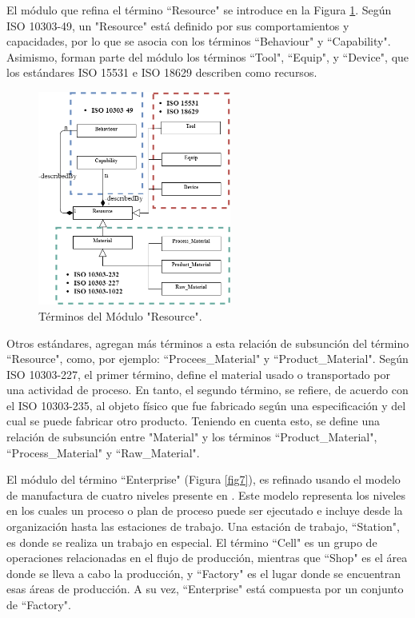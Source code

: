 \documentclass[journal]{IEEEtran}
\begin{document}
El m\'odulo que refina el t\'ermino ``Resource" se introduce en la Figura \ref{fig6}. Seg\'un ISO 10303-49, un "Resource" est\'a definido por sus comportamientos y capacidades, por lo que se asocia con los t\'erminos ``Behaviour" y ``Capability". Asimismo, forman parte del m\'odulo los t\'erminos ``Tool", ``Equip", y ``Device", que los est\'andares ISO 15531 e ISO 18629 describen como recursos. 

\begin{figure}[!t]
\centering
\includegraphics[width=2.5in]{figures/figure6.png}
\caption{T\'erminos del M\'odulo "Resource".}
\label{fig6}
\end{figure}

Otros est\'andares, agregan m\'as t\'erminos a esta relaci\'on de subsunci\'on del t\'ermino ``Resource", como, por ejemplo: ``Procees\_Material" y ``Product\_Material". Seg\'un ISO 10303-227, el primer t\'ermino, define el material usado o transportado por una actividad de proceso. En tanto, el segundo t\'ermino, se refiere, de acuerdo con el ISO 10303-235, al objeto f\'isico que fue fabricado seg\'un una especificaci\'on y del cual se puede fabricar otro producto. Teniendo en cuenta esto, se define una relaci\'on de subsunci\'on entre "Material" y los t\'erminos ``Product\_Material", ``Process\_Material" y ``Raw\_Material".

El m\'odulo del t\'ermino ``Enterprise" (Figura \ref{fig7}), es refinado usando el modelo de manufactura de cuatro niveles presente en \cite{Zhao1999}. Este modelo representa los niveles en los cuales un proceso o plan de proceso puede ser ejecutado e incluye desde la organizaci\'on hasta las estaciones de trabajo. Una estaci\'on de trabajo, ``Station", es donde se realiza un trabajo en especial. El t\'ermino ``Cell" es un grupo de operaciones relacionadas en el flujo de producci\'on, mientras que ``Shop" es el \'area donde se lleva a cabo la producci\'on, y ``Factory" es el lugar donde se encuentran esas \'areas de producci\'on. A su vez, ``Enterprise" est\'a compuesta por un conjunto de ``Factory".
\end{document}
